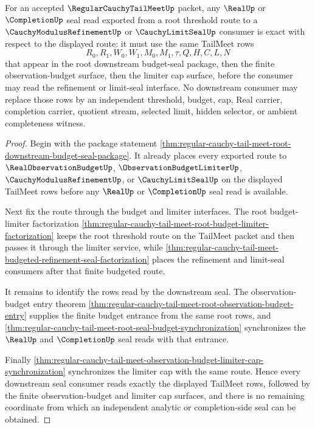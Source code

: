 \begin{theorem}
\label{thm:regular-cauchy-tail-meet-root-seal-exactness}
For an accepted $\RegularCauchyTailMeetUp$ packet, any $\RealUp$ or $\CompletionUp$ seal read exported from a root threshold route to a $\CauchyModulusRefinementUp$ or $\CauchyLimitSealUp$ consumer is exact with respect to the displayed route: it must use the same TailMeet rows
$$
R_0,R_1,W_0,W_1,M_0,M_1,\tau,Q,H,C,L,N
$$
that appear in the root downstream budget-seal package, then the finite observation-budget surface, then the limiter cap surface, before the consumer may read the refinement or limit-seal interface. No downstream consumer may replace those rows by an independent threshold, budget, cap, Real carrier, completion carrier, quotient stream, selected limit, hidden selector, or ambient completeness witness.
\end{theorem}
\begin{proof}
Begin with the package statement \autoref{thm:regular-cauchy-tail-meet-root-downstream-budget-seal-package}. It already places every exported route to $\RealObservationBudgetUp$, $\ObservationBudgetLimiterUp$, $\CauchyModulusRefinementUp$, or $\CauchyLimitSealUp$ on the displayed TailMeet rows before any $\RealUp$ or $\CompletionUp$ seal read is available.

Next fix the route through the budget and limiter interfaces. The root budget-limiter factorization \autoref{thm:regular-cauchy-tail-meet-root-budget-limiter-factorization} keeps the root threshold route on the TailMeet packet and then passes it through the limiter service, while \autoref{thm:regular-cauchy-tail-meet-budgeted-refinement-seal-factorization} places the refinement and limit-seal consumers after that finite budgeted route.

It remains to identify the rows read by the downstream seal. The observation-budget entry theorem \autoref{thm:regular-cauchy-tail-meet-root-observation-budget-entry} supplies the finite budget entrance from the same root rows, and \autoref{thm:regular-cauchy-tail-meet-root-seal-budget-synchronization} synchronizes the $\RealUp$ and $\CompletionUp$ seal reads with that entrance.

Finally \autoref{thm:regular-cauchy-tail-meet-observation-budget-limiter-cap-synchronization} synchronizes the limiter cap with the same route. Hence every downstream seal consumer reads exactly the displayed TailMeet rows, followed by the finite observation-budget and limiter cap surfaces, and there is no remaining coordinate from which an independent analytic or completion-side seal can be obtained.
\end{proof}

